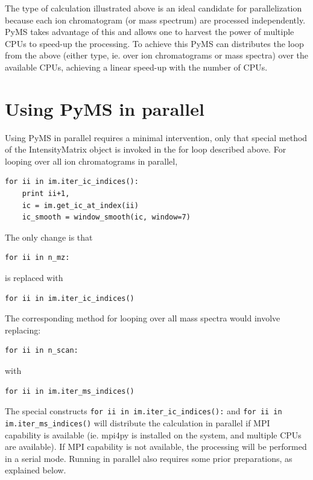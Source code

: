 The type of calculation illustrated above is an ideal candidate
for parallelization because each ion chromatogram (or mass
spectrum) are processed independently. PyMS takes advantage
of this and allows one to harvest the power of multiple CPUs
to speed-up the processing. To achieve this PyMS can distributes
the loop from the above (either type, ie. over ion chromatograms
or mass spectra) over the available CPUs, achieving a linear
speed-up with the number of CPUs.


\section{\label{sec:parallel-pyms}Using PyMS in parallel}

Using PyMS in parallel requires a minimal intervention, only
that special method of the IntensityMatrix object is invoked
in the for loop described above. For looping over all ion
chromatograms in parallel,

\begin{verbatim}
for ii in im.iter_ic_indices():
    print ii+1,
    ic = im.get_ic_at_index(ii)
    ic_smooth = window_smooth(ic, window=7)
\end{verbatim}

The only change is that 

\begin{verbatim}
for ii in n_mz:
\end{verbatim}

is replaced with

\begin{verbatim}
for ii in im.iter_ic_indices()
\end{verbatim}

The corresponding method for looping over all mass spectra
would involve replacing:

\begin{verbatim}
for ii in n_scan:
\end{verbatim}

with

\begin{verbatim}
for ii in im.iter_ms_indices()
\end{verbatim}

The special constructs {\tt for ii in im.iter\_ic\_indices():} and
{\tt for ii in im.iter\_ms\_indices()} will distribute the calculation
in parallel if MPI capability is available (ie. mpi4py is installed
on the system, and multiple CPUs are available). If MPI capability
is not available, the processing will be performed in a serial mode.
Running in parallel also requires some prior preparations, as explained
below.

